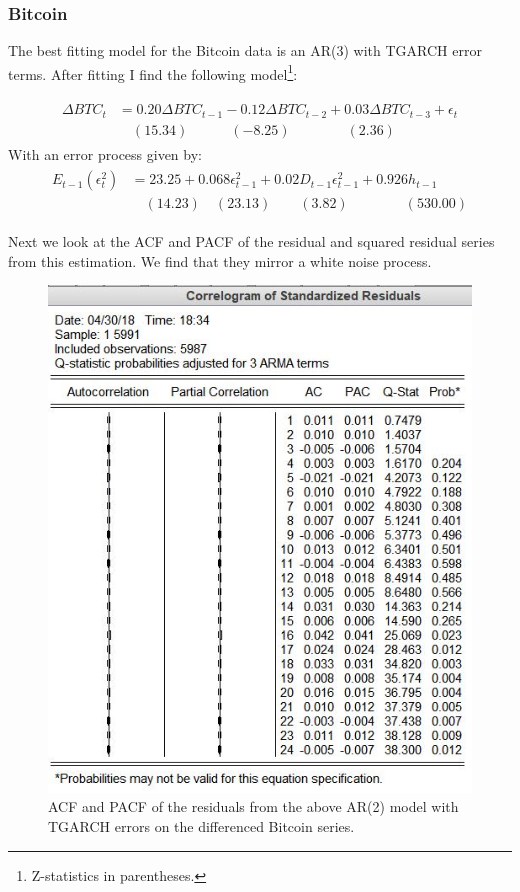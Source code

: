 \documentclass{article}
\begin{document}
	\subsubsection{Bitcoin}
	The best fitting model for the Bitcoin data is an AR(3) with TGARCH error terms. After fitting I find the following model\footnote{Z-statistics in parentheses.}: 
	
	\begin{align}
	\begin{split}
		\Delta BTC_t &= 0.20 \Delta BTC_{t-1} - 0.12 \Delta BTC_{t-2} + 0.03 \Delta BTC_{t-3} + \epsilon_t\\
		 & \quad (15.34) \quad \quad \quad (-8.25) \quad \quad \quad \quad (2.36)
	\end{split}
	\end{align}
	With an error process given by: 
	\begin{align}
	\begin{split}
	E_{t-1}(\epsilon_t^2)  &= 23.25 + 0.068 \epsilon^2_{t-1} + 0.02 D_{t-1} \epsilon^2_{t-1} + 0.926 h_{t-1}\\
	& \quad (14.23) \quad (23.13) \quad \quad (3.82) \quad \quad \quad \quad (530.00)
	\end{split}
	\end{align}
	
	Next we look at the ACF and PACF of the residual and squared residual series from this estimation. We find that they mirror a white noise process.  
	\begin{figure}[H]
		\centering
		\includegraphics[width = .75\textwidth]{btcTGARCH_residCor.jpg}
		\caption{ACF and PACF of the residuals from the above AR(2) model with TGARCH errors on the differenced Bitcoin series.}
	\end{figure}
\end{document}
